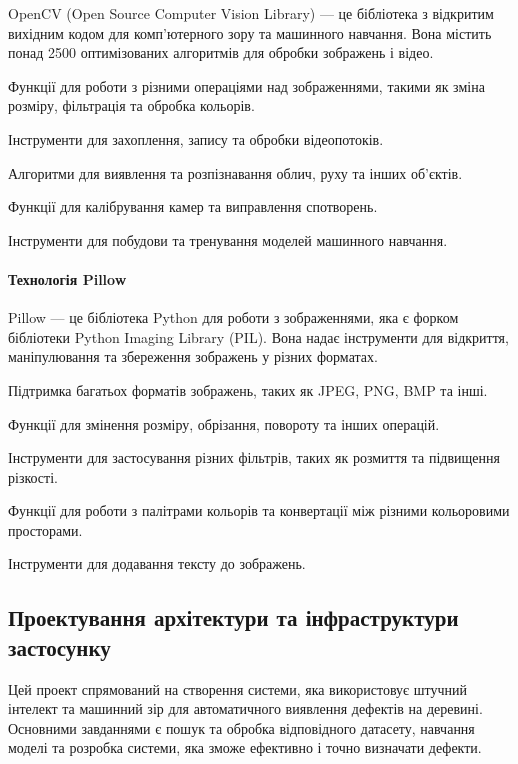 \documentclass[oneside,14pt]{extarticle}
\begin{document}
OpenCV (Open Source Computer Vision Library) — це бібліотека з відкритим вихідним кодом для комп'ютерного зору та машинного навчання. Вона містить понад 2500 оптимізованих алгоритмів для обробки зображень і відео.

\begin{list}{-}{Основні можливості OpenCV:}
	\item Функції для роботи з різними операціями над зображеннями, такими як зміна розміру, фільтрація та обробка кольорів.
	\item Інструменти для захоплення, запису та обробки відеопотоків.
	\item Алгоритми для виявлення та розпізнавання облич, руху та інших об'єктів.
	\item Функції для калібрування камер та виправлення спотворень.
	\item Інструменти для побудови та тренування моделей машинного навчання.
\end{list}

\paragraph{Технологія Pillow}

Pillow — це бібліотека Python для роботи з зображеннями, яка є форком бібліотеки Python Imaging Library (PIL). Вона надає інструменти для відкриття, маніпулювання та збереження зображень у різних форматах.

\begin{list}{-}{Основні можливості Pillow:}
	\item Підтримка багатьох форматів зображень, таких як JPEG, PNG, BMP та інші.
	\item Функції для змінення розміру, обрізання, повороту та інших операцій.
	\item Інструменти для застосування різних фільтрів, таких як розмиття та підвищення різкості.
	\item Функції для роботи з палітрами кольорів та конвертації між різними кольоровими просторами.
	\item Інструменти для додавання тексту до зображень.
\end{list}

\subsection{Проектування архітектури та інфраструктури застосунку}

Цей проект спрямований на створення системи, яка використовує штучний інтелект та машинний зір для автоматичного виявлення дефектів на деревині. Основними завданнями є пошук та обробка відповідного датасету, навчання моделі та розробка системи, яка зможе ефективно і точно визначати дефекти.
\end{document}
